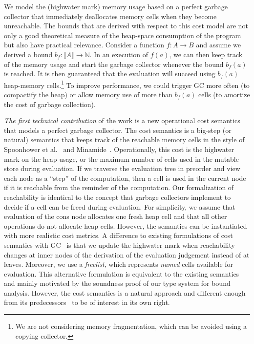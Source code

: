\documentclass{easychair}
\newcommand{\denote}[1]{\llbracket#1\rrbracket}
\theoremstyle{definition}
\begin{document}
We model the (highwater mark) memory
usage based on a perfect garbage collector that immediately
deallocates memory cells when they become unreachable. The bounds that
are derived with respect to this cost model are not only a good theoretical
measure of the heap-space consumption of the program but also have practical
relevance. Consider a function $f : A \to B$ and assume we derived a
bound $b_f : \denote{A} \to \mathbb{N}$. In an execution of $f(a)$, we
can then keep track of the memory usage and start the garbage
collector whenever the bound $b_f(a)$ is reached. It is then
guaranteed that the evaluation will succeed using $b_f(a)$ heap-memory
cells.\footnote{We are not considering memory fragmentation, which
  can be avoided using a copying collector.} To improve performance,
we could trigger GC more often (to compactify the heap) 
or allow memory use of more than $b_f(a)$ cells 
(to amortize the cost of garbage collection).

\emph{The first technical contribution} of the work is a new
operational cost semantics that models a perfect garbage collector.
%
The cost semantics is a big-step (or natural) semantics that keeps
track of the reachable memory cells in the style of Spoonhower et
al.~\cite{Spoonhower:2008:SPP:1411204.1411240} and
Minamide~\cite{DBLP:journals/entcs/Minamide99}. Operationally, this
cost is the highwater mark on the heap usage, or the maximum number of
cells used in the mutable store during evaluation. If we traverse the 
evaluation tree in preorder and view each node as a ``step'' 
of the computation, then a cell is used in the current node
if it is reachable from the reminder of the
computation. Our formalization of reachability is identical to the
concept that garbage collectors implement to decide if a cell can be
freed during evaluation. For simplicity, we assume that evaluation of
the cons node allocates one fresh heap cell and that all other
operations do not allocate heap cells. However, the semantics can be
instantiated with more realistic cost metrics. A difference to
existing formulations of cost semantics with
GC~\cite{Morrisett95,Spoonhower:2008:SPP:1411204.1411240,DBLP:journals/entcs/Minamide99}
is that we update the highwater mark when reachability changes at
inner nodes of the derivation of the evaluation judgement instead of at
leaves. Moreover, we use a \emph{freelist}, which represents \emph{named}
cells available for evaluation. This alternative formulation is
equivalent to the existing semantics and mainly motivated by the
soundness proof of our type system for bound analysis.  However, the
cost semantics is a natural approach and different enough from its
predecessors~\cite{Spoonhower:2008:SPP:1411204.1411240,DBLP:journals/entcs/Minamide99}
to be of interest in its own right.
\end{document}
